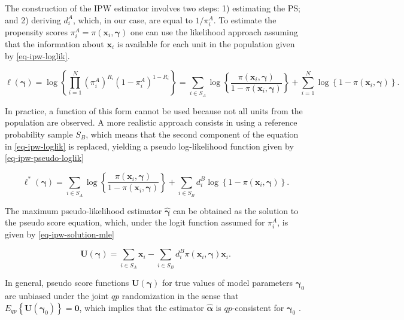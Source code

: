 \documentclass[
]{jss}
\begin{document}
The construction of the IPW estimator involves two steps: 1) estimating
the PS; and 2) deriving \(d_i^A\), which, in our case, are equal to
\(1/\pi_i^A\). To estimate the propensity scores
\(\pi_i^A=\pi(\boldsymbol{x}_i, \boldsymbol{\gamma})\) one can use the
likelihood approach assuming that the information about
\(\boldsymbol{x}_i\) is available for each unit in the population given
by \eqref{eq-ipw-loglik}.

\begin{equation}
\ell(\boldsymbol{\gamma}) = \log\left\{\prod_{i=1}^N \left(\pi_i^A\right)^{R_i}\left(1-\pi_i^A\right)^{1-R_i}\right\} =
\sum_{i \in S_{A}} \log \left\{\frac{\pi\left(\boldsymbol{x}_i, \boldsymbol{\gamma}\right)}{1-\pi\left(\boldsymbol{x}_i, \boldsymbol{\gamma}\right)}\right\}+\sum_{i=1}^N \log \left\{1-\pi\left(\boldsymbol{x}_i, \boldsymbol{\gamma}\right)\right\}.
\label{eq-ipw-loglik}
\end{equation}

In practice, a function of this form cannot be used because not all
units from the population are observed. A more realistic approach
consists in using a reference probability sample \(S_B\), which means
that the second component of the equation in \eqref{eq-ipw-loglik} is
replaced, yielding a pseudo log-likelihood function given by
\eqref{eq-ipw-pseudo-loglik}

\begin{equation}
\ell^*(\boldsymbol{\gamma}) = \sum_{i \in S_{A}} \log \left\{\frac{\pi\left(\boldsymbol{x}_i, \boldsymbol{\gamma}\right)}{1-\pi\left(\boldsymbol{x}_i, \boldsymbol{\gamma}\right)}\right\}+ \sum_{i \in S_{B}} d_i^B \log \left\{1-\pi\left(\boldsymbol{x}_i, \boldsymbol{\gamma}\right)\right\}.
\label{eq-ipw-pseudo-loglik}
\end{equation}

The maximum pseudo-likelihood estimator \(\hat{\boldsymbol{\gamma}}\)
can be obtained as the solution to the pseudo score equation, which,
under the logit function assumed for \(\pi_i^A\), is given by
\eqref{eq-ipw-solution-mle}

\begin{equation}
\boldsymbol{U}(\boldsymbol{\gamma}) = \sum_{i \in S_A} \boldsymbol{x}_i - \sum_{i \in S_B} d_i^B \pi(\boldsymbol{x}_i, \boldsymbol{\gamma}) \boldsymbol{x}_i.
\label{eq-ipw-solution-mle}
\end{equation}

In general, pseudo score functions
\(\boldsymbol{U}(\boldsymbol{\gamma})\) for true values of model
parameters \(\boldsymbol{\gamma}_0\) are unbiased under the joint
\(q p\) randomization in the sense that
\(E_{q p}\left\{\boldsymbol{U}\left(\boldsymbol{\gamma}_0\right)\right\}=\boldsymbol{0}\),
which implies that the estimator \(\hat{\boldsymbol{\alpha}}\) is
\(qp\)-consistent for \(\boldsymbol{\gamma}_0\)
\citep{wu2022statistical}.
\end{document}
